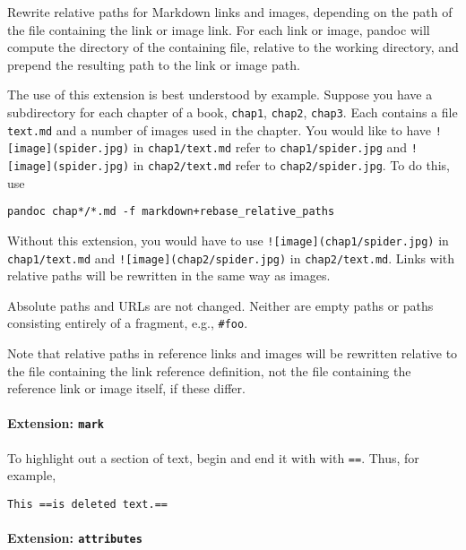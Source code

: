 \documentclass[
  a4paper,
]{article}
\begin{document}
Rewrite relative paths for Markdown links and images, depending on the
path of the file containing the link or image link. For each link or
image, pandoc will compute the directory of the containing file,
relative to the working directory, and prepend the resulting path to the
link or image path.

The use of this extension is best understood by example. Suppose you
have a subdirectory for each chapter of a book, \texttt{chap1},
\texttt{chap2}, \texttt{chap3}. Each contains a file \texttt{text.md}
and a number of images used in the chapter. You would like to have
\texttt{!{[}image{]}(spider.jpg)} in \texttt{chap1/text.md} refer to
\texttt{chap1/spider.jpg} and \texttt{!{[}image{]}(spider.jpg)} in
\texttt{chap2/text.md} refer to \texttt{chap2/spider.jpg}. To do this,
use

\begin{verbatim}
pandoc chap*/*.md -f markdown+rebase_relative_paths
\end{verbatim}

Without this extension, you would have to use
\texttt{!{[}image{]}(chap1/spider.jpg)} in \texttt{chap1/text.md} and
\texttt{!{[}image{]}(chap2/spider.jpg)} in \texttt{chap2/text.md}. Links
with relative paths will be rewritten in the same way as images.

Absolute paths and URLs are not changed. Neither are empty paths or
paths consisting entirely of a fragment, e.g., \texttt{\#foo}.

Note that relative paths in reference links and images will be rewritten
relative to the file containing the link reference definition, not the
file containing the reference link or image itself, if these differ.

\hypertarget{extension-mark}{%
\paragraph{\texorpdfstring{Extension:
\texttt{mark}}{Extension: mark}}\label{extension-mark}}

To highlight out a section of text, begin and end it with with
\texttt{==}. Thus, for example,

\begin{verbatim}
This ==is deleted text.==
\end{verbatim}

\hypertarget{extension-attributes}{%
\paragraph{\texorpdfstring{Extension:
\texttt{attributes}}{Extension: attributes}}\label{extension-attributes}}
\end{document}
